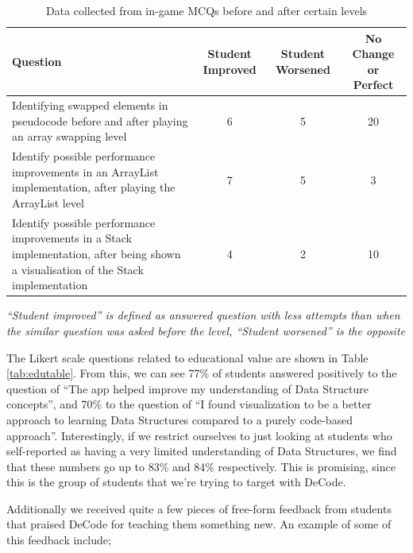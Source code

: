 \documentclass[11pt]{article}
\begin{document}
\begin{table}[]
  \small
  \begin{tabulary}{\linewidth}{|L|C|C|C|}
  \hline
  \textbf{Question}                                                                                                                   & \textbf{Student Improved} & \textbf{Student Worsened} & \textbf{No Change or Perfect} \\ \hline
  Identifying swapped elements in pseudocode before and after playing an array swapping level                                         & 6                         & 5                         & 20                         \\ \hline
  Identify possible performance improvements in an ArrayList implementation, after playing the ArrayList level                        & 7                         & 5                         & 3                          \\ \hline
  Identify possible performance improvements in a Stack implementation, after being shown a visualisation of the Stack implementation & 4                         & 2                         & 10                         \\ \hline
   \end{tabulary}
   \emph{``Student improved'' is defined as answered question with less attempts than when the similar question was asked before the level, ``Student worsened'' is the opposite}
  \caption{Data collected from in-game MCQs before and after certain levels}
  \label{tab:edudatatable}
\end{table}
The Likert scale questions related to educational value are shown in Table \ref{tab:edutable}. From this, we can see 77\% of students answered positively to the question of ``The app helped improve my understanding of Data Structure concepts'', and 70\% to the question of ``I found visualization to be a better approach to learning Data Structures compared to a purely code-based approach''. Interestingly, if we restrict ourselves to just looking at students who self-reported as having a very limited understanding of Data Structures, we find that these numbers go up to 83\% and 84\% respectively. This is promising, since this is the group of students that we're trying to target with DeCode.\par
Additionally we received quite a few pieces of free-form feedback from students that praised DeCode for teaching them something new. An example of some of this feedback include;
\end{document}
